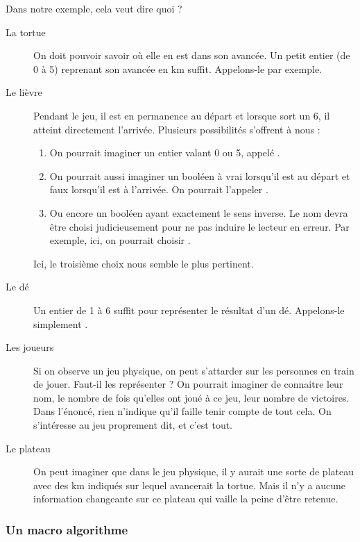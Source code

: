 			Dans notre exemple, cela veut dire quoi ?
			\begin{description}
			\item[La tortue]
				On doit pouvoir savoir où elle en est dans son avancée.
				Un petit entier (de 0 à 5) reprenant son avancée en km suffit.
				Appelons-le  par exemple.
			\item[Le lièvre]
				Pendant le jeu, il est en permanence au départ
				et lorsque sort un 6, il atteint directement l'arrivée.
				Plusieurs possibilités s'offrent à nous :
			
				\begin{enumerate}
				\item
					On pourrait imaginer un entier valant 0 ou 5,
					appelé .
				\item
					On pourrait aussi imaginer un booléen à vrai 
					lorsqu'il est au départ et faux lorsqu'il est à l'arrivée.
					On pourrait l'appeler .
				\item
					Ou encore un booléen ayant exactement le sens inverse.
					Le nom devra être choisi judicieusement pour ne pas induire
					le lecteur en erreur.
					Par exemple, ici, on pourrait choisir .
				\end{enumerate}
				
				Ici, le troisième choix nous semble le plus pertinent.
			\item[Le dé]
				Un entier de 1 à 6 suffit pour représenter le résultat d'un dé.
				Appelons-le simplement .
			\item[Les joueurs]
				Si on observe un jeu physique,
				on peut s'attarder sur les personnes en train de jouer.
				Faut-il les représenter ?
				On pourrait imaginer de connaitre leur nom,
				le nombre de fois qu'elles ont joué à ce jeu,
				leur nombre de victoires.
				Dans l'énoncé, 
				rien n'indique qu'il faille tenir compte de tout cela. 
				On s'intéresse au jeu proprement dit, et c'est tout.
			\item[Le plateau]
				On peut imaginer que dans le jeu physique,
				il y aurait une sorte de plateau 
				avec des km indiqués
				sur lequel avancerait la tortue.
				Mais il n'y a aucune information changeante
				sur ce plateau qui vaille la peine d'être retenue.
			\end{description}

		\subsubsection*{Un macro algorithme}
				
